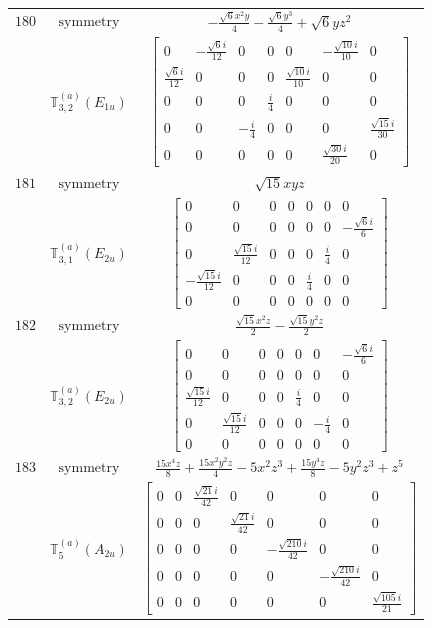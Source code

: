 \documentclass[fleqn,8pt,landscape]{jsarticle}
\begin{document}
\begin{longtable}{ccc}
$ 180 $ & $ \text{symmetry} $ & $ - \frac{\sqrt{6} x^{2} y}{4} - \frac{\sqrt{6} y^{3}}{4} + \sqrt{6} y z^{2} $ \\
$  $ & $ \mathbb{T}_{3,2}^{(a)}(E_{1u}) $ & $ \begin{bmatrix} 0 & - \frac{\sqrt{6} i}{12} & 0 & 0 & 0 & - \frac{\sqrt{10} i}{10} & 0 \\ \frac{\sqrt{6} i}{12} & 0 & 0 & 0 & \frac{\sqrt{10} i}{10} & 0 & 0 \\ 0 & 0 & 0 & \frac{i}{4} & 0 & 0 & 0 \\ 0 & 0 & - \frac{i}{4} & 0 & 0 & 0 & \frac{\sqrt{15} i}{30} \\ 0 & 0 & 0 & 0 & 0 & \frac{\sqrt{30} i}{20} & 0 \end{bmatrix} $ \\ \hline
$ 181 $ & $ \text{symmetry} $ & $ \sqrt{15} x y z $ \\
$  $ & $ \mathbb{T}_{3,1}^{(a)}(E_{2u}) $ & $ \begin{bmatrix} 0 & 0 & 0 & 0 & 0 & 0 & 0 \\ 0 & 0 & 0 & 0 & 0 & 0 & - \frac{\sqrt{6} i}{6} \\ 0 & \frac{\sqrt{15} i}{12} & 0 & 0 & 0 & \frac{i}{4} & 0 \\ - \frac{\sqrt{15} i}{12} & 0 & 0 & 0 & \frac{i}{4} & 0 & 0 \\ 0 & 0 & 0 & 0 & 0 & 0 & 0 \end{bmatrix} $ \\ \hline
$ 182 $ & $ \text{symmetry} $ & $ \frac{\sqrt{15} x^{2} z}{2} - \frac{\sqrt{15} y^{2} z}{2} $ \\
$  $ & $ \mathbb{T}_{3,2}^{(a)}(E_{2u}) $ & $ \begin{bmatrix} 0 & 0 & 0 & 0 & 0 & 0 & - \frac{\sqrt{6} i}{6} \\ 0 & 0 & 0 & 0 & 0 & 0 & 0 \\ \frac{\sqrt{15} i}{12} & 0 & 0 & 0 & \frac{i}{4} & 0 & 0 \\ 0 & \frac{\sqrt{15} i}{12} & 0 & 0 & 0 & - \frac{i}{4} & 0 \\ 0 & 0 & 0 & 0 & 0 & 0 & 0 \end{bmatrix} $ \\ \hline
$ 183 $ & $ \text{symmetry} $ & $ \frac{15 x^{4} z}{8} + \frac{15 x^{2} y^{2} z}{4} - 5 x^{2} z^{3} + \frac{15 y^{4} z}{8} - 5 y^{2} z^{3} + z^{5} $ \\
$  $ & $ \mathbb{T}_{5}^{(a)}(A_{2u}) $ & $ \begin{bmatrix} 0 & 0 & \frac{\sqrt{21} i}{42} & 0 & 0 & 0 & 0 \\ 0 & 0 & 0 & \frac{\sqrt{21} i}{42} & 0 & 0 & 0 \\ 0 & 0 & 0 & 0 & - \frac{\sqrt{210} i}{42} & 0 & 0 \\ 0 & 0 & 0 & 0 & 0 & - \frac{\sqrt{210} i}{42} & 0 \\ 0 & 0 & 0 & 0 & 0 & 0 & \frac{\sqrt{105} i}{21} \end{bmatrix} $ \\ \hline

\end{longtable}
\end{document}
